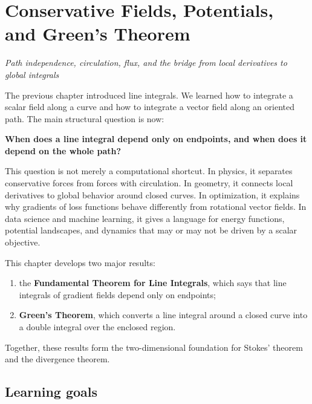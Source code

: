 \documentclass[11pt,oneside]{book}
\begin{document}
\setcounter{chapter}{20}

\chapter[Conservative Fields, Potentials, and Green's Theorem]{Conservative Fields, Potentials,\\ and Green's Theorem}
\textit{Path independence, circulation, flux, and the bridge from local derivatives to global integrals}

The previous chapter introduced line integrals. We learned how to integrate a scalar field along a curve and how to integrate a vector field along an oriented path. The main structural question is now:

\begin{center}
\Large\bfseries When does a line integral depend only on endpoints, and when does it depend on the whole path?
\end{center}

This question is not merely a computational shortcut. In physics, it separates conservative forces from forces with circulation. In geometry, it connects local derivatives to global behavior around closed curves. In optimization, it explains why gradients of loss functions behave differently from rotational vector fields. In data science and machine learning, it gives a language for energy functions, potential landscapes, and dynamics that may or may not be driven by a scalar objective.

\begin{mainideabox}
This chapter develops two major results:
\begin{enumerate}
  \item the \textbf{Fundamental Theorem for Line Integrals}, which says that line integrals of gradient fields depend only on endpoints;
  \item \textbf{Green's Theorem}, which converts a line integral around a closed curve into a double integral over the enclosed region.
\end{enumerate}
Together, these results form the two-dimensional foundation for Stokes' theorem and the divergence theorem.
\end{mainideabox}

\section{Learning goals}
\end{document}
